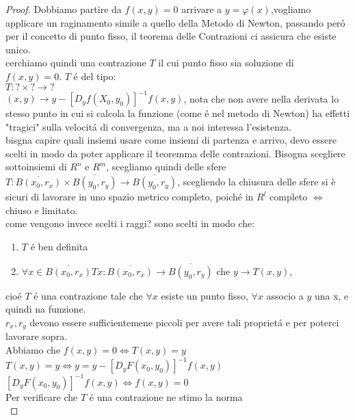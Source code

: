 \begin{proof}
	Dobbiamo partire da $f(x,y)=0$ arrivare a $y=\varphi(x)$,vogliamo applicare un raginamento simile a quello della Metodo di Newton, passando per\'o per il concetto di punto fisso, il teorema delle Contrazioni ci assicura che esiste unico.\\
	cerchiamo quindi una contrazione $T$ il cui punto fisso sia soluzione di $f(x,y)=0$. $T$ \'e del tipo:\\
	$T:?\times ?\rightarrow ?$\\
	$(x,y)\rightarrow y-[D_yf(X_0,y_0)]^{-1}f(x,y)$, nota che non avere nella derivata lo stesso punto in cui si calcola la funzione (come \'e nel metodo di Newton) ha effetti "tragici" sulla velocit\'a di convergenza, ma a noi interessa l'esistenza.\\
	bisgna capire quali insiemi usare come insiemi di partenza e arrivo, devo essere scelti in modo da poter applicare il teoremma delle contrazioni. Bisogna scegliere sottoinsiemi di $R^n$ e $R^m$, scegliamo quindi delle sfere\\
	$T:\overline{B(x_0,r_x)}\times\overline{B(y_0,r_y)}\rightarrow\overline{B(y_0,r_y)}$, scegliendo la chiusura delle sfere si è sicuri di lavorare in uno spazio metrico completo, poich\'e in $R^l$ completo $\Leftrightarrow$ chiuso e limitato.\\
	come vengono invece scelti i raggi? sono scelti in modo che:\\
	\begin{enumerate}
		\item $T$ \'e ben definita
		\item $\forall x \in \overline{B(x_0,r_x)} Tx: \overline{B(x_0,r_x)}\rightarrow\overline{B(y_0,r_y)}$ che $y\rightarrow T(x,y)$,\\
	\end{enumerate}
	cio\'e $T$ \'e una contrazione tale che $\forall x$ esiste un punto fisso, $\forall x$ associo a $y$ una x, e quindi na funzione.\\
	$r_x,r_y$ devono essere sufficientemene piccoli per avere tali propriet\'a e per poterci lavorare sopra.\\
	Abbiamo che $f(x,y)=0 \Leftrightarrow T(x,y)=y$\\
	$T(x,y)=y\Leftrightarrow y=y-[D_yF(x_0,y_0)]^{-1}f(x,y)$\\
	$[D_yF(x_0,y_0)]^{-1}f(x,y)\Leftrightarrow f(x,y)=0$\\
	Per verificare che $T$ \'e una contrazione ne stimo la norma\\

\end{proof}
